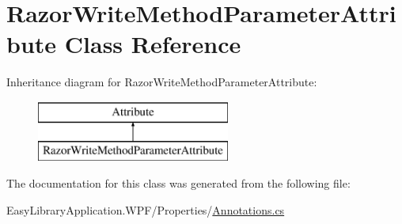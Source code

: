 \hypertarget{class_razor_write_method_parameter_attribute}{}\section{Razor\+Write\+Method\+Parameter\+Attribute Class Reference}
\label{class_razor_write_method_parameter_attribute}
Inheritance diagram for Razor\+Write\+Method\+Parameter\+Attribute\+:\begin{figure}[H]
\begin{center}
\leavevmode
\includegraphics[height=2.000000cm]{class_razor_write_method_parameter_attribute}
\end{center}
\end{figure}


The documentation for this class was generated from the following file\+:\begin{DoxyCompactItemize}
\item 
Easy\+Library\+Application.\+W\+P\+F/\+Properties/\mbox{\hyperlink{_annotations_8cs}{Annotations.\+cs}}\end{DoxyCompactItemize}
